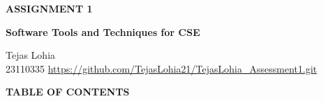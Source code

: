 \documentclass[12pt, a4paper]{report}
\begin{document}
\begin{titlepage}
    \centering
    \vspace*{\fill} %
    
    {\color{customOrange}\Huge\bfseries ASSIGNMENT 1}
    
    \vspace{0.75cm} %
    
    {\Large\bfseries Software Tools and Techniques for CSE}
    
    \vfill %
    
    \colorbox{customOrange}{%
        \parbox{1.0\textwidth}{%
            \centering
            \vspace{1em} %
            {\Large\color{white} Tejas Lohia} \\[0.5em] %
            {\large\color{white} 23110335} %
            {\large\color{white} \mbox{\url{https://github.com/TejasLohia21/TejasLohia_Assessment1.git}}} %
            \vspace{1em} %
        }
    }
    
    \vspace*{\fill} %
\end{titlepage}




\renewcommand{\cfttoctitlefont}{\hfill} 
\renewcommand{\cftaftertoctitle}{\hfill}
{\noindent\colorbox{customOrange}{\parbox{\textwidth}{\vspace{0.4em}\Large\bfseries\color{white}\hspace{1em}TABLE OF CONTENTS\vspace{0.4em}}}}

\tableofcontents 
\end{document}
